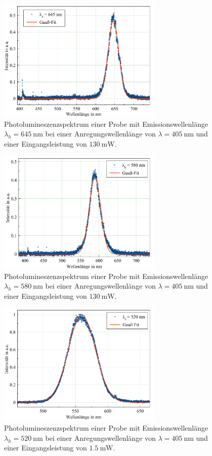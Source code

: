 \begin{figure}[H]
  \centering
  \includegraphics[width=0.7\textwidth]{plots/PL_645nm.png}
  \caption{Photolumineszenzspektrum einer Probe mit Emissionswellenlänge $\lambda_h=\SI{645}{\nano\meter}$ bei einer Anregungswellenlänge von $\lambda=\SI{405}{\nano\meter}$ und einer Eingangsleistung von $\SI{130}{\milli\watt}$.}
  \label{fig:pl645}
\end{figure}
\begin{figure}[H]
  \centering
  \includegraphics[width=0.7\textwidth]{plots/PL_580nm.png}
  \caption{Photolumineszenzspektrum einer Probe mit Emissionswellenlänge $\lambda_h=\SI{580}{\nano\meter}$ bei einer Anregungswellenlänge von $\lambda=\SI{405}{\nano\meter}$ und einer Eingangsleistung von $\SI{130}{\milli\watt}$.}
  \label{fig:pl580}
\end{figure}
\begin{figure}[H]
  \centering
  \includegraphics[width=0.7\textwidth]{plots/PL_520nm.png}
  \caption{Photolumineszenzspektrum einer Probe mit Emissionswellenlänge $\lambda_h=\SI{520}{\nano\meter}$ bei einer Anregungswellenlänge von $\lambda=\SI{405}{\nano\meter}$ und einer Eingangsleistung von $\SI{1,5}{\milli\watt}$.}
  \label{fig:pl520}
\end{figure}

